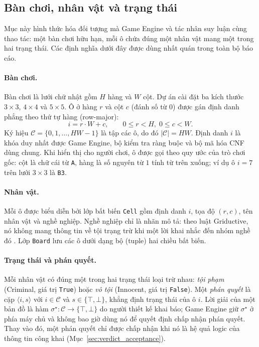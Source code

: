 \subsection{Bàn chơi, nhân vật và trạng thái}
\label{sec:game_model}

Mục này hình thức hóa đối tượng mà Game Engine và tác nhân suy luận cùng thao
tác: một bàn chơi hữu hạn, mỗi ô chứa đúng một nhân vật mang một trong hai trạng
thái. Các định nghĩa dưới đây được dùng nhất quán trong toàn bộ báo cáo.

\paragraph{Bàn chơi.}
Bàn chơi là lưới chữ nhật gồm $H$ hàng và $W$ cột. Dự án cài đặt ba kích thước
$3\times3$, $4\times4$ và $5\times5$. Ô ở hàng $r$ và cột $c$ (đánh số từ $0$)
được gán định danh phẳng theo thứ tự hàng (row-major):
\begin{equation}
  i = r\cdot W + c, \qquad 0 \le r < H,\; 0 \le c < W.
  \label{eq:cell_id}
\end{equation}
Ký hiệu $\mathcal{C} = \{0, 1, \ldots, HW-1\}$ là tập các ô, do đó
$|\mathcal{C}| = HW$. Định danh $i$ là khóa duy nhất được Game Engine, bộ kiểm
tra ràng buộc và bộ mã hóa CNF dùng chung. Khi hiển thị cho người chơi, ô được
gọi theo quy ước của trò chơi gốc: cột là chữ cái từ \texttt{A}, hàng là số
nguyên từ $1$ tính từ trên xuống; ví dụ ô $i=7$ trên lưới $3\times3$ là
\texttt{B3}.

\paragraph{Nhân vật.}
Mỗi ô được biểu diễn bởi lớp bất biến \texttt{Cell} gồm định danh $i$, tọa độ
$(r, c)$, tên nhân vật và nghề nghiệp. Nghề nghiệp chỉ là nhãn mô tả: theo luật
Griductive, nó không mang thông tin về tội trạng trừ khi một lời khai nhắc đến
nhóm nghề đó \cite{griductive_rules}. Lớp \texttt{Board} lưu các ô dưới dạng
bộ (tuple) hai chiều bất biến.

\paragraph{Trạng thái và phán quyết.}
Mỗi nhân vật có đúng một trong hai trạng thái loại trừ nhau: \emph{tội phạm}
(Criminal, giá trị \texttt{True}) hoặc \emph{vô tội} (Innocent, giá trị
\texttt{False}). Một \emph{phán quyết} là cặp $\langle i, s\rangle$ với
$i \in \mathcal{C}$ và $s \in \{\top, \bot\}$, khẳng định trạng thái của ô $i$.
Lời giải của một bản đồ là hàm $\sigma^\star : \mathcal{C} \to \{\top,\bot\}$
do người thiết kế khai báo; Game Engine giữ $\sigma^\star$ ở phía máy chủ và
không bao giờ dùng nó để quyết định chấp nhận phán quyết. Thay vào đó, một
phán quyết chỉ được chấp nhận khi nó là hệ quả logic của thông tin công khai
(Mục~\ref{sec:verdict_acceptance}).
